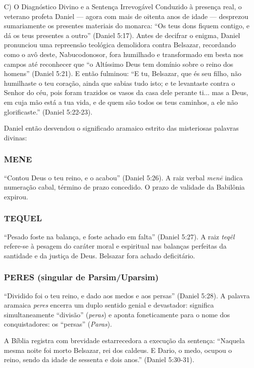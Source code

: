 C) O Diagnóstico Divino e a Sentença Irrevogável
Conduzido à presença real, o veterano profeta Daniel — agora com mais de oitenta anos de idade — desprezou sumariamente os presentes materiais do monarca: ``Os teus dons fiquem contigo, e dá os teus presentes a outro'' (Daniel 5:17). Antes de decifrar o enigma, Daniel pronunciou uma repreensão teológica demolidora contra Belsazar, recordando como o avô deste, Nabucodonosor, fora humilhado e transformado em besta nos campos até reconhecer que ``o Altíssimo Deus tem domínio sobre o reino dos homens'' (Daniel 5:21). E então fulminou:
``E tu, Belsazar, que és seu filho, não humilhaste o teu coração, ainda que sabias tudo isto; e te levantaste contra o Senhor do céu, pois foram trazidos os vasos da casa dele perante ti... mas a Deus, em cuja mão está a tua vida, e de quem são todos os teus caminhos, a ele não glorificaste.'' (Daniel 5:22-23).

Daniel então desvendou o significado aramaico estrito das misteriosas palavras divinas:

\subsubsection*{MENE}
``Contou Deus o teu reino, e o acabou'' (Daniel 5:26). A raiz verbal \textit{menē} indica numeração cabal, término de prazo concedido. O prazo de validade da Babilônia expirou.

\subsubsection*{TEQUEL}
``Pesado foste na balança, e foste achado em falta'' (Daniel 5:27). A raiz \textit{teqêl} refere-se à pesagem do caráter moral e espiritual nas balanças perfeitas da santidade e da justiça de Deus. Belsazar fora achado deficitário.

\subsubsection*{PERES (singular de Parsim/Uparsim)}
``Dividido foi o teu reino, e dado aos medos e aos persas'' (Daniel 5:28). A palavra aramaica \textit{peres} encerra um duplo sentido genial e devastador: significa simultaneamente ``divisão'' (\textit{peras}) e aponta foneticamente para o nome dos conquistadores: os ``persas'' (\textit{Paras}).

A Bíblia registra com brevidade estarrecedora a execução da sentença:
``Naquela mesma noite foi morto Belsazar, rei dos caldeus. E Dario, o medo, ocupou o reino, sendo da idade de sessenta e dois anos.'' (Daniel 5:30-31).



